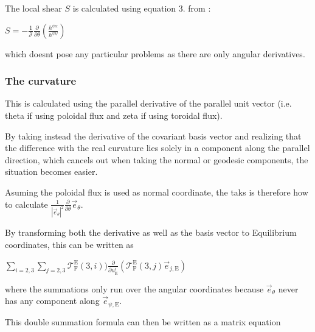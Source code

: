 The local shear $S$ is calculated using equation 3. from \cite{Weyens3D} \+:

$S = - \frac{1}{\mathcal{J}} \frac{\partial}{\partial \theta} \left(\frac{ h^{\psi\alpha}}{ h^{\psi \psi}}\right)$

which doesn\textquotesingle{}t pose any particular problems as there are only angular derivatives.

\subsubsection*{The curvature }

This is calculated using the parallel derivative of the parallel unit vector (i.\+e. theta if using poloidal flux and zeta if using toroidal flux).

By taking instead the derivative of the covariant basis vector and realizing that the difference with the real curvature lies solely in a component along the parallel direction, which cancels out when taking the normal or geodesic components, the situation becomes easier.

Asuming the poloidal flux is used as normal coordinate, the taks is therefore how to calculate $\frac{1}{\left|\vec{e}_\theta\right|^2} \frac{\partial}{\partial \theta} \vec{e}_\theta$.

By transforming both the derivative as well as the basis vector to Equilibrium coordinates, this can be written as

$\sum_{i=2,3} \sum_{j=2,3} \mathcal{T}_\text{F}^\text{E} \left(3,i\right)) \frac{\partial}{\partial u^i_\text{E}} \left( \mathcal{T}_\text{F}^\text{E} \left(3,j\right) \vec{e}_{j,\text{E}}\right)$

where the summations only run over the angular coordinates because $\vec{e}_\theta$ never has any component along $\vec{e}_{\psi,\text{E}}$.

This double summation formula can then be written as a matrix equation

